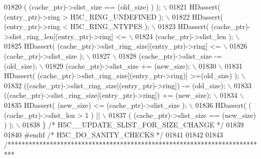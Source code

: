 \begin{DoxyCode}
01820 \textcolor{preprocessor}{              ( (cache\_ptr)->slist\_size == (old\_size) ) );                    \(\backslash\)}
01821 \textcolor{preprocessor}{    HDassert( (entry\_ptr)->ring > H5C\_RING\_UNDEFINED );                       \(\backslash\)}
01822 \textcolor{preprocessor}{    HDassert( (entry\_ptr)->ring < H5C\_RING\_NTYPES );                          \(\backslash\)}
01823 \textcolor{preprocessor}{    HDassert( (cache\_ptr)->slist\_ring\_len[(entry\_ptr)->ring] <=               \(\backslash\)}
01824 \textcolor{preprocessor}{              (cache\_ptr)->slist\_len );                                       \(\backslash\)}
01825 \textcolor{preprocessor}{    HDassert( (cache\_ptr)->slist\_ring\_size[(entry\_ptr)->ring] <=              \(\backslash\)}
01826 \textcolor{preprocessor}{              (cache\_ptr)->slist\_size );                                      \(\backslash\)}
01827 \textcolor{preprocessor}{                                                                              \(\backslash\)}
01828 \textcolor{preprocessor}{    (cache\_ptr)->slist\_size -= (old\_size);                                    \(\backslash\)}
01829 \textcolor{preprocessor}{    (cache\_ptr)->slist\_size += (new\_size);                                    \(\backslash\)}
01830 \textcolor{preprocessor}{                                                                              \(\backslash\)}
01831 \textcolor{preprocessor}{    HDassert( (cache\_ptr)->slist\_ring\_size[(entry\_ptr->ring)] >=(old\_size) ); \(\backslash\)}
01832 \textcolor{preprocessor}{    ((cache\_ptr)->slist\_ring\_size[(entry\_ptr)->ring]) -= (old\_size);          \(\backslash\)}
01833 \textcolor{preprocessor}{    ((cache\_ptr)->slist\_ring\_size[(entry\_ptr)->ring]) += (new\_size);          \(\backslash\)}
01834 \textcolor{preprocessor}{                                                                              \(\backslash\)}
01835 \textcolor{preprocessor}{    HDassert( (new\_size) <= (cache\_ptr)->slist\_size );                        \(\backslash\)}
01836 \textcolor{preprocessor}{    HDassert( ( (cache\_ptr)->slist\_len > 1 ) ||                               \(\backslash\)}
01837 \textcolor{preprocessor}{              ( (cache\_ptr)->slist\_size == (new\_size) ) );                    \(\backslash\)}
01838 \textcolor{preprocessor}{\} }\textcolor{comment}{/* H5C\_\_UPDATE\_SLIST\_FOR\_SIZE\_CHANGE */}\textcolor{preprocessor}{}
01839 
01840 \textcolor{preprocessor}{#endif }\textcolor{comment}{/* H5C\_DO\_SANITY\_CHECKS */}\textcolor{preprocessor}{}
01841 
01842 
01843 \textcolor{comment}{/**************************************************************************}

\end{DoxyCode}
